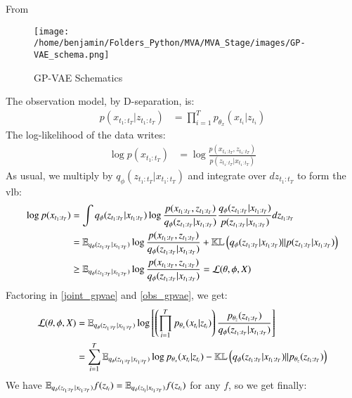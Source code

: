 From \cite{li_disentangled_2018}
\begin{figure}[H]
        \centering
        \label{fig:schema_model_gpvae}
        \texttt{[image: /home/benjamin/Folders\_Python/MVA/MVA\_Stage/images/GP-VAE\_schema.png]}
        \caption{GP-VAE Schematics}
\end{figure}

The observation model, by D-separation, is:
\begin{align}
\label{obs_gpvae}
    p(x_{t_1:t_T} \vert z_{t_1:t_T}) &= \prod_{i=1}^T p_{\theta_x}(x_{t_i} \vert z_{t_i})
\end{align}
The log-likelihood of the data writes:
\begin{align}
    \log{p(x_{t_1:t_T})} &= \log{\frac{p(x_{t_1:t_T}, z_{t_1:t_T})}{p(z_{t_1:t_T} \vert x_{t_1:t_T})}}
\end{align}
As usual, we multiply by $q_{\phi}(z_{t_1:t_T} \vert x_{t_1:t_T})$ and integrate over $dz_{t_1:t_T}$ to form the \gls{vlb}:
\begin{align}
    \log{p(x_{t_1:t_T})} &= \int q_{\phi}(z_{t_1:t_T} \vert x_{t_1:t_T}) \log{\frac{p(x_{t_1:t_T}, z_{t_1:t_T})}{q_{\phi}(z_{t_1:t_T}\vert x_{t_1:t_T})}\frac{q_{\phi}(z_{t_1:t_T}\vert x_{t_1:t_T})}{p(z_{t_1:t_T} \vert x_{t_1:t_T})}} dz_{t_1:t_T} \\
    &= \mathbb{E}_{q_{\phi}(z_{t_1:t_T} \vert x_{t_1:t_T})} \log{\frac{p(x_{t_1:t_T}, z_{t_1:t_T})}{q_{\phi}(z_{t_1:t_T} \vert x_{t_1:t_T})}} + \mathbb{KL}\left( q_{\phi}(z_{t_1:t_T} \vert x_{t_1:t_T}) \vert\vert p(z_{t_1:t_T} \vert x_{t_1:t_T}) \right) \\
    &\geq \mathbb{E}_{q_{\phi}(z_{t_1:t_T} \vert x_{t_1:t_T})} \log{\frac{p(x_{t_1:t_T}, z_{t_1:t_T})}{q_{\phi}(z_{t_1:t_T} \vert x_{t_1:t_T})}} = \mathcal{L}(\theta, \phi, X)
\end{align}
Factoring in \ref{joint_gpvae} and \ref{obs_gpvae}, we get:
\begin{align}
    \mathcal{L}(\theta, \phi, X) &= \mathbb{E}_{q_{\phi}(z_{t_1:t_T} \vert x_{t_1:t_T})} \log{\left[ \left( \prod_{i=1}^T p_{\theta_x}(x_{t_i} \vert z_{t_i}) \right) \frac{p_{\theta_z}(z_{t_1:t_T})}{q_{\phi}(z_{t_1:t_T} \vert x_{t_1:t_T})}
    \right]} \\
    &= \sum_{i=1}^T \mathbb{E}_{q_{\phi}(z_{t_1:t_T} \vert x_{t_1:t_T})} \log{p_{\theta_x}(x_{t_i} \vert z_{t_i})} - \mathbb{KL}\left( q_{\phi}(z_{t_1:t_T} \vert x_{t_1:t_T}) \vert\vert p_{\theta_z}(z_{t_1:t_T}) \right)
\end{align}
We have $\mathbb{E}_{q_{\phi}(z_{t_1:t_T} \vert x_{t_1:t_T})} f(z_{t_i}) = \mathbb{E}_{q_{\phi}(z_{t_i} \vert x_{t_1:t_T})} f(z_{t_i})$ for any $f$, so we get finally:
